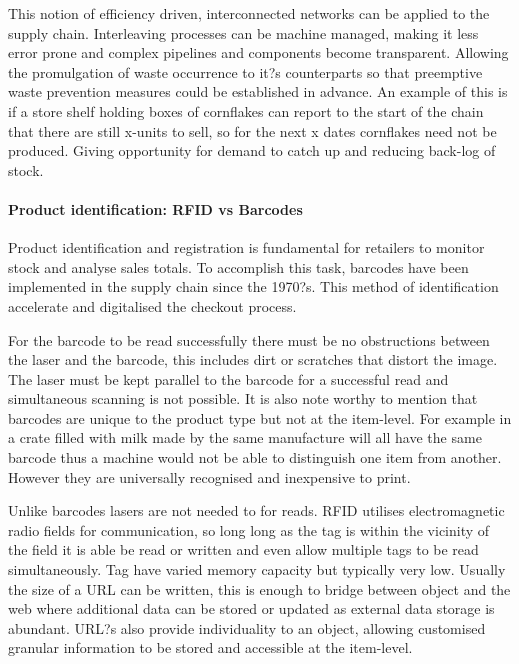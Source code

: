 \documentclass[a4paper, 11pt]{article}
\begin{document}
This notion of efficiency driven, interconnected networks can be applied to the supply chain. Interleaving processes can be machine managed, making it less error prone and complex pipelines and components become transparent. Allowing the promulgation of waste occurrence to it?s counterparts so that preemptive waste prevention measures could be established in advance. An example of this is if a store shelf holding boxes of cornflakes can report to the start of the chain that there are still x-units to sell, so for the next x dates cornflakes need not be produced. Giving opportunity for demand to catch up and reducing back-log of stock.

\paragraph{Product identification: RFID vs Barcodes}Product identification and registration is fundamental for retailers to monitor stock and analyse sales totals. To accomplish this task, barcodes have been implemented in the supply chain since the 1970?s. This method of identification accelerate and digitalised the checkout process. 

For the barcode to be read successfully there must be no obstructions between the laser and the barcode, this includes dirt or scratches that distort the image. The laser must be kept parallel to the barcode for a successful read and simultaneous scanning is not possible. It is also note worthy to mention that barcodes are unique to the product type but not at the item-level. For example in a crate filled with milk made by the same manufacture will all have the same barcode thus a machine would not be able to distinguish one item from another. However they are universally recognised and inexpensive to print. 

Unlike barcodes lasers are not needed to for reads. RFID utilises electromagnetic radio fields for communication, so long long as the tag is within the vicinity of the field it is able be read or written and even allow multiple tags to be read simultaneously. Tag have varied memory capacity but typically very low. Usually the size of a URL can be written, this is enough to bridge between object and the web where additional data can be stored or updated as external data storage is abundant. URL?s also provide individuality to an object, allowing customised granular information to be stored and accessible at the item-level.


\vspace{\baselineskip}
\vspace{\baselineskip}
\vspace{\baselineskip}
\end{document}
